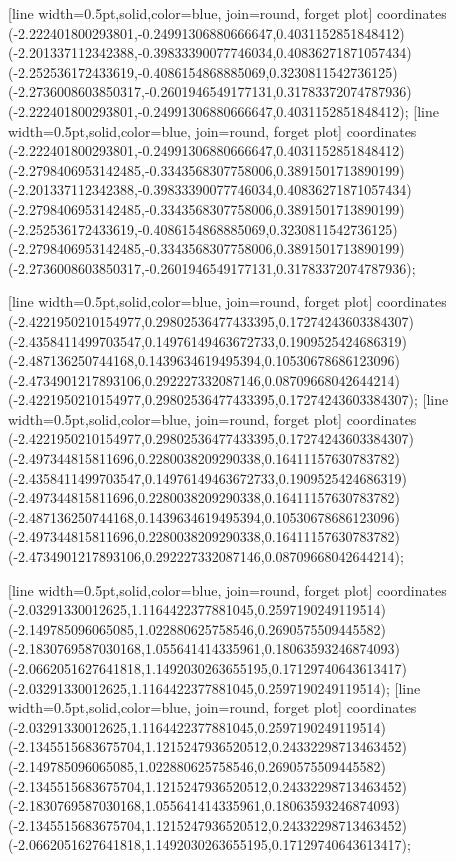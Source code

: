[line width=0.5pt,solid,color=blue, join=round, forget plot] coordinates {(-2.222401800293801,-0.24991306880666647,0.4031152851848412) (-2.201337112342388,-0.39833390077746034,0.40836271871057434) (-2.252536172433619,-0.4086154868885069,0.3230811542736125) (-2.2736008603850317,-0.2601946549177131,0.31783372074787936) (-2.222401800293801,-0.24991306880666647,0.4031152851848412)};
[line width=0.5pt,solid,color=blue, join=round, forget plot] coordinates {(-2.222401800293801,-0.24991306880666647,0.4031152851848412) (-2.2798406953142485,-0.3343568307758006,0.3891501713890199) (-2.201337112342388,-0.39833390077746034,0.40836271871057434) (-2.2798406953142485,-0.3343568307758006,0.3891501713890199) (-2.252536172433619,-0.4086154868885069,0.3230811542736125) (-2.2798406953142485,-0.3343568307758006,0.3891501713890199) (-2.2736008603850317,-0.2601946549177131,0.31783372074787936)};

[line width=0.5pt,solid,color=blue, join=round, forget plot] coordinates {(-2.4221950210154977,0.29802536477433395,0.17274243603384307) (-2.4358411499703547,0.14976149463672733,0.1909525424686319) (-2.487136250744168,0.1439634619495394,0.10530678686123096) (-2.4734901217893106,0.292227332087146,0.08709668042644214) (-2.4221950210154977,0.29802536477433395,0.17274243603384307)};
[line width=0.5pt,solid,color=blue, join=round, forget plot] coordinates {(-2.4221950210154977,0.29802536477433395,0.17274243603384307) (-2.497344815811696,0.2280038209290338,0.16411157630783782) (-2.4358411499703547,0.14976149463672733,0.1909525424686319) (-2.497344815811696,0.2280038209290338,0.16411157630783782) (-2.487136250744168,0.1439634619495394,0.10530678686123096) (-2.497344815811696,0.2280038209290338,0.16411157630783782) (-2.4734901217893106,0.292227332087146,0.08709668042644214)};

[line width=0.5pt,solid,color=blue, join=round, forget plot] coordinates {(-2.03291330012625,1.1164422377881045,0.2597190249119514) (-2.149785096065085,1.022880625758546,0.2690575509445582) (-2.1830769587030168,1.055641414335961,0.18063593246874093) (-2.0662051627641818,1.1492030263655195,0.17129740643613417) (-2.03291330012625,1.1164422377881045,0.2597190249119514)};
[line width=0.5pt,solid,color=blue, join=round, forget plot] coordinates {(-2.03291330012625,1.1164422377881045,0.2597190249119514) (-2.1345515683675704,1.1215247936520512,0.24332298713463452) (-2.149785096065085,1.022880625758546,0.2690575509445582) (-2.1345515683675704,1.1215247936520512,0.24332298713463452) (-2.1830769587030168,1.055641414335961,0.18063593246874093) (-2.1345515683675704,1.1215247936520512,0.24332298713463452) (-2.0662051627641818,1.1492030263655195,0.17129740643613417)};

